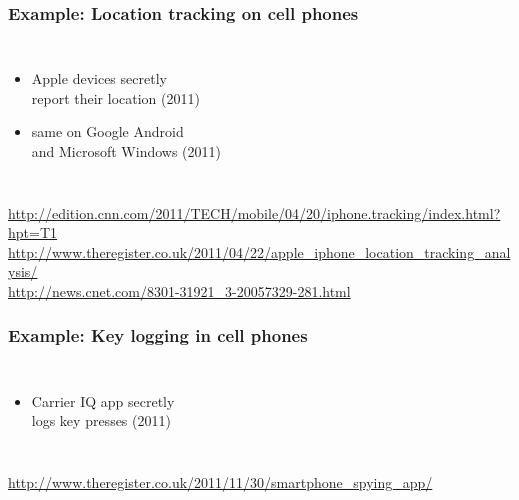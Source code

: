 \documentclass[dvipsnames]{beamer}
\theoremstyle{definition}
\theoremstyle{example}
\theoremstyle{plain}
\begin{document}
\begin{frame}
  \frametitle{Example: Location tracking on cell phones}

  \begin{columns}

    \begin{itemize}
      \item Apple devices secretly\\
        report their location (2011)
      \item same on Google Android\\
        and Microsoft Windows (2011)
    \end{itemize}
  \end{columns}

  \medskip
  \tiny{\url{http://edition.cnn.com/2011/TECH/mobile/04/20/iphone.tracking/index.html?hpt=T1}}\\
  \tiny{\url{http://www.theregister.co.uk/2011/04/22/apple_iphone_location_tracking_analysis/}}\\
  \tiny{\url{http://news.cnet.com/8301-31921_3-20057329-281.html}}\\
\end{frame}

\begin{frame}
  \frametitle{Example: Key logging in cell phones}

  \begin{columns}

    \begin{itemize}
      \item Carrier IQ app secretly\\
        logs key presses (2011)
    \end{itemize}
  \end{columns}

  \medskip
  \tiny{\url{http://www.theregister.co.uk/2011/11/30/smartphone_spying_app/}}\\
\end{frame}
\end{document}

